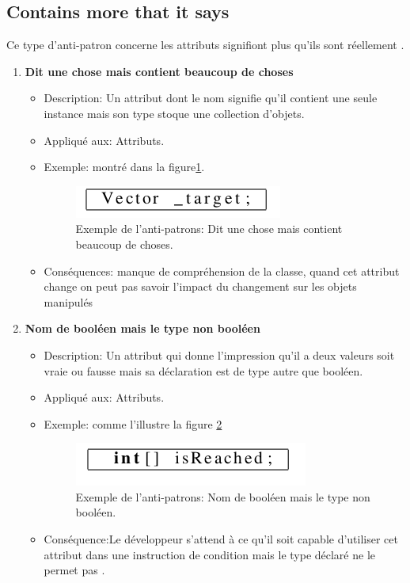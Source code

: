 \subsection{Contains more that it says}
Ce type d'anti-patron concerne les  attributs signifiont plus qu'ils sont réellement \cite{arnaoudova2013new}.
\begin{enumerate}
    

\item \textbf {Dit une chose mais contient beaucoup de choses}
\begin{itemize}
\item Description: Un attribut dont le nom signifie qu’il contient une seule instance mais son type stoque une collection d’objets.
\item Appliqué aux: Attributs.
\item Exemple: montré dans la figure\ref{fig:quatre_un}.
\begin{figure}[H]
	\centering
\includegraphics[width=0.9\linewidth]{Others/Resources/quatre_un.png}
	\caption{Exemple de l'anti-patrons:  Dit une chose mais contient beaucoup de choses\cite{arnaoudova2013new}.}
		\label{fig:quatre_un}
	\end{figure}
\item Conséquences: manque de compréhension de la classe, quand cet attribut change on peut pas savoir l’impact du changement sur les objets manipulés
\end{itemize}

\item \textbf {Nom de booléen mais le type non booléen}
\begin{itemize}

\item Description: Un attribut qui donne l’impression qu’il a deux valeurs soit vraie ou fausse mais sa déclaration est de type  autre que booléen.
\item Appliqué aux: Attributs.
\item Exemple:  comme l’illustre la figure \ref{fig:quatre_deux}
\begin{figure}[H]
	\centering
\includegraphics[width=0.9\linewidth]{Others/Resources/quatre_deux.png}
	\caption{Exemple de l'anti-patrons: Nom de booléen mais le type non booléen\cite{arnaoudova2013new}.}
		\label{fig:quatre_deux}
	\end{figure}
\item Conséquence:Le développeur s’attend à ce qu’il soit capable d’utiliser cet attribut dans une instruction de condition mais le type déclaré ne le permet pas .

\end{itemize}
\end{enumerate}
